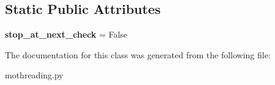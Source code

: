 \subsection*{Static Public Attributes}
\begin{DoxyCompactItemize}
\item 
\hypertarget{classpyagilis_1_1mothreading_1_1_motor_thread_aab8630b572c8538136b3058cad670b2d}{}{\bfseries stop\+\_\+at\+\_\+next\+\_\+check} = False\label{classpyagilis_1_1mothreading_1_1_motor_thread_aab8630b572c8538136b3058cad670b2d}

\end{DoxyCompactItemize}


The documentation for this class was generated from the following file\+:\begin{DoxyCompactItemize}
\item 
mothreading.\+py\end{DoxyCompactItemize}
